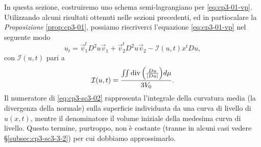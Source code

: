 In questa sezione, costruiremo uno schema semi-lagrangiano per
\eqref{eq:cp3-01-vp}. Utilizzando alcuni risultati ottenuti nelle
sezioni precedenti, ed in partiocalare la
\emph{Proposizione} \ref{prop:cp3-01}, possiamo riscriverci l'equazione \eqref{eq:cp3-01-vp} nel seguente modo
\begin{equation}
\label{eq:cp3-sc3-01}
u_t = \vec{v}_1^tD^2u\vec{v}_1 +\vec{v}_2^tD^2u\vec{v}_2-\mathcal{I}(u,t)x^tDu,
\end{equation}
con $\mathcal{I}(u,t)$ pari a
\begin{equation}
\label{eq:cp3-sc3-02}
\mathcal{I}(u,t) = \frac{\iint\operatorname{div}{\left(\frac{Du}{|Du|}\right)}d\mu}{3V_0}.
\end{equation}
Il numeratore di \eqref{eq:cp3-sc3-02} rappresenta l'integrale della
curvatura media (la divergenza della normale) sulla superficie
individuata da una curva di livello di $u(x,t)$, mentre il
denominatore il volume iniziale della medesima curva di livello. Questo
termine, purtroppo, non è costante (tranne in alcuni casi vedere
§\ref{subsec:cp3-sc3-3-2}) per cui dobbiamo
approssimarlo.
%
